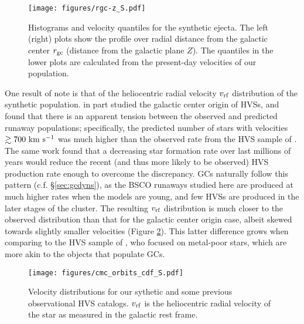 \documentclass[twocolumn]{aastex631}
\begin{document}
\begin{figure*}
    \begin{centering}
        \texttt{[image: figures/rgc-z\_S.pdf]}
        \caption{
            Histograms and velocity quantiles for the synthetic ejecta.
            The left (right) plots show the profile over radial distance from the galactic center $r_{\rm gc}$ (distance from the galactic plane $Z$).
            The quantiles in the lower plots are calculated from the present-day velocities of our population.
        }
        \label{fig:rgc-z}
    \end{centering}
\end{figure*}

One result of note is that of the heliocentric radial velocity $v_{\rm rf}$ distribution of the synthetic population.
\citet{2021arXiv211213864G} in part studied the galactic center origin of HVSs, and found that there is an apparent tension between the observed and predicted runaway populations; specifically, the predicted number of stars with velocities $\gtrsim 700~{\rm km~s^{-1}}$ was much higher than the observed rate from the HVS sample of \citet{2018ApJ...866...39B}.
The same work found that a decreasing star formation rate over last millions of years would reduce the recent (and thus more likely to be observed) HVS production rate enough to overcome the discrepancy.
GCs naturally follow this pattern (c.f. \S\ref{sec:gcdyns}), as the BSCO runaways studied here are produced at much higher rates when the models are young, and few HVSs are produced in the later stages of the cluster.
The resulting $v_{\rm rf}$ distribution is much closer to the observed distribution than that for the galactic center origin case, albeit skewed towards slightly smaller velocities (Figure \ref{fig:cmc_orbits_cdf}).
This latter difference grows when comparing to the HVS sample of \citet{2018ApJ...866..121H}, who focused on metal-poor stars, which are more akin to the objects that populate GCs.

\begin{figure}
    \begin{centering}
        \texttt{[image: figures/cmc\_orbits\_cdf\_S.pdf]}
        \caption{
            Velocity distributions for our sythetic and some previous observational HVS catalogs.
            $v_{\rm rf}$ is the heliocentric radial velocity of the star as measured in the galactic rest frame.
        }
        \label{fig:cmc_orbits_cdf}
    \end{centering}
\end{figure}
\end{document}
